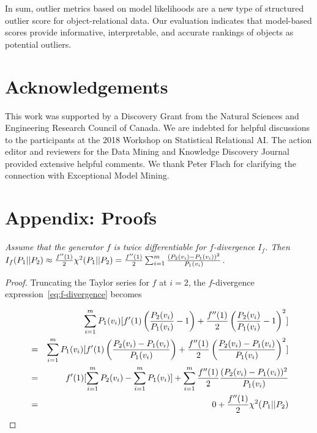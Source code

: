 {								
In sum, outlier metrics based on model likelihoods are a new type of structured outlier score for object-relational data.  Our evaluation indicates that  model-based scores provide informative, interpretable, and accurate rankings of objects as potential outliers. 
								
\section*{Acknowledgements} This work was supported by a Discovery Grant from the Natural Sciences and Engineering Research Council of Canada. We are indebted for helpful discussions to the participants at the 2018 Workshop on Statistical Relational AI. The action editor and reviewers for the Data Mining and Knowledge Discovery Journal provided extensive helpful comments. We thank Peter Flach for clarifying the connection with Exceptional Model Mining.

\section{Appendix: Proofs} \label{sec:proofs}

{\em 
Assume that the generator $f$ is twice differentiable for $f$-divergence $I_{f}$. Then $I_{f}(P_{1}||P_{2}) \approx \frac{f''(1)}{2} \chi^{2}(P_{1}||P_{2}) = \frac{f''(1)}{2} 
\sum_{i=1}^{m}  \frac{(P_{2}(v_{i})-P_{1}(v_{i}))^{2}}
 {P_{1}(v_{i})}$. 
}
\begin{proof}

Truncating the Taylor series for $f$ at $i=2$, the $f$-divergence expression~\ref{eq:f-divergence} becomes 

\begin{eqnarray*}
& & \sum_{i=1}^{m} P_{1}(v_{i}) [f'(1) \left(\frac{P_{2}(v_{i})}{P_{1}(v_{i})}-1\right) + \frac{f''(1)}{2} \left(\frac{P_{2}(v_{i})}{P_{1}(v_{i})}-1\right)^{2}]  \\
& = &\sum_{i=1}^{m} P_{1}(v_{i}) [f'(1) \left(\frac{P_{2}(v_{i})-P_{1}(v_{i})}{P_{1}(v_{i})}\right) + \frac{f''(1)}{2} \left(\frac{P_{2}(v_{i})-P_{1}(v_{i})}{P_{1}(v_{i})}\right)^{2}] \\
 & = & f'(1) [\sum_{i=1}^{m} P_{2}(v_{i}) - \sum_{i=1}^{m} P_{1}(v_{i})] + \sum_{i=1}^{m} \frac{f''(1)}{2} 
 \frac{(P_{2}(v_{i})-P_{1}(v_{i}))^{2}}
 {P_{1}(v_{i})} \\
& = &   0 + \frac{f''(1)}{2} \chi^{2}(P_{1}||P_{2})
\end{eqnarray*}


\end{proof}}
